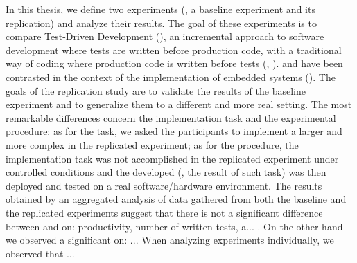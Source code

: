 In this thesis, we define two experiments (\ie, a baseline experiment and its replication) and analyze their results. The goal of these experiments is  to compare Test-Driven Development (\tdd), an incremental approach to software development where tests are written before production code, with a traditional way of coding where production code is written before tests (\ie, \notdd). \tdd and \notdd have been contrasted in the context of the implementation of embedded systems (\ess). The goals of the replication study are to validate the results of the baseline experiment and to generalize them to a different and more real setting. The most remarkable differences concern the implementation task and the experimental procedure: as for the task, we asked the participants to implement a larger and more complex \es in the replicated experiment; as for the procedure, the implementation task was not accomplished in the replicated experiment under controlled conditions and the developed \es (\ie, the result of such task) was then deployed and tested on a real software/hardware environment.  
The results obtained by an aggregated analysis of data gathered from both the baseline and the replicated experiments suggest that there is not a significant difference between \tdd and \notdd on: productivity, number of written tests, a... . On the other hand we observed a significant  on: ... When analyzing experiments individually, we observed that ... 